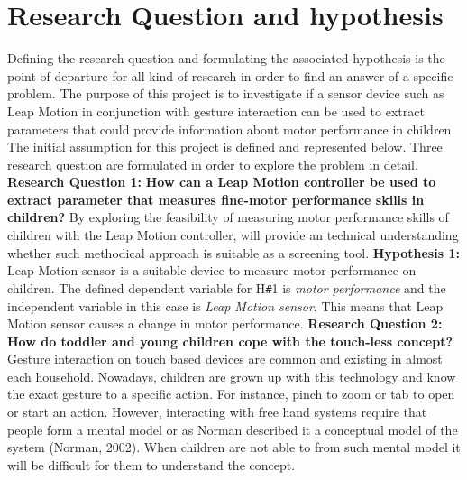 \vspace{50mm} %
\hfill 
\break
\section{Research Question and hypothesis}
\label{sec:researchquestion}
Defining the research question and formulating the associated hypothesis is the point of departure for all kind of research in order to find an answer of a specific problem.
\newline
The purpose of this project is to investigate if a sensor device such as Leap Motion in conjunction with gesture interaction can be used to extract parameters that could provide information about motor performance in children. The initial assumption for this project is defined and represented below. Three research question are formulated in order to explore the problem in detail.
\vspace{3mm} %
\hfill \break
\textbf{Research Question 1:}\newline
\textbf{How can a Leap Motion controller be used to extract parameter that measures fine-motor performance skills in children?}
\newline
By exploring the feasibility of measuring motor performance skills of children with the Leap Motion controller, will provide an technical understanding whether such methodical approach is suitable as a screening tool.   
\newline
\textbf{Hypothesis 1:} Leap Motion sensor is a suitable device to measure motor performance on children.
\vspace{3mm} %
\hfill \break
The defined dependent variable for H\texttt{\#}1 is \textit{motor performance} and the independent variable in this case is \textit{Leap Motion sensor}. This means that Leap Motion sensor causes a change in motor performance.
\vspace{3mm} %
\hfill \break
\textbf{Research Question 2:}\newline
\textbf{How do toddler and young children cope with the touch-less concept?}
\newline
Gesture interaction on touch based devices are common and existing in almost each household. Nowadays, children are grown up with this technology and know the exact gesture to a specific action. For instance, pinch to zoom or tab to open or start an action. However, interacting with free hand systems require that people form a mental model or as Norman described it a conceptual model of the system (Norman, 2002). When children are not able to from such mental model it will be difficult for them to understand the concept.
